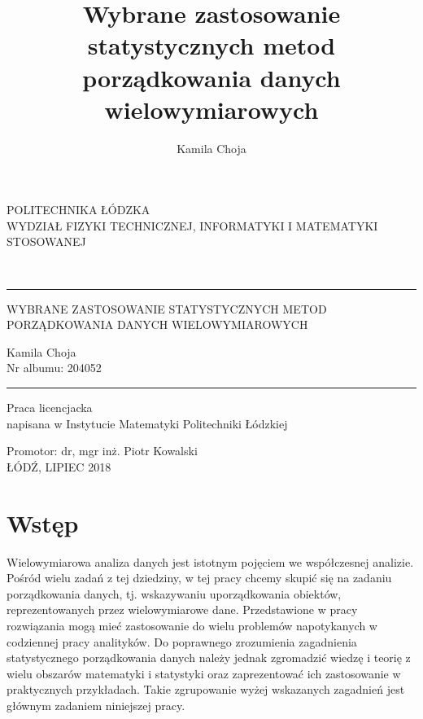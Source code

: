 \documentclass[12pt,a4paper]{report}
\author{Kamila Choja}
\title{Wybrane zastosowanie statystycznych metod porządkowania danych wielowymiarowych}
\begin{document}
\begin{titlepage}
\begin{center}
        \vspace*{1cm}
        {\large POLITECHNIKA ŁÓDZKA}\\
       \vspace*{1cm}
        {\large WYDZIAŁ FIZYKI TECHNICZNEJ, INFORMATYKI I MATEMATYKI STOSOWANEJ}\\
        \vspace*{2cm}
    \end{center}        
        
\\
\vspace*{0.3cm}
\hspace*{0.3cm}
  
\begin{center}
\rule{\textwidth}{0.5pt}

\vspace*{0.5cm}
   
{\large WYBRANE ZASTOSOWANIE STATYSTYCZNYCH METOD\\ }
{\large PORZĄDKOWANIA DANYCH WIELOWYMIAROWYCH\\}
\vspace*{1cm}


\begin{flushright}
Kamila Choja\\
Nr albumu: 204052 
 \end{flushright}
\rule{\textwidth}{0.5pt}

Praca licencjacka\\
napisana w Instytucie Matematyki Politechniki Łódzkiej\\

\vspace*{2cm}

Promotor: dr, mgr inż. Piotr Kowalski\\
\vfill
ŁÓDŹ, LIPIEC 2018


     \end{center}   
\end{titlepage}

\tableofcontents

\chapter{Wstęp}
Wielowymiarowa analiza danych jest istotnym pojęciem we współczesnej analizie. Pośród wielu zadań z tej dziedziny, w tej pracy chcemy skupić się na zadaniu porządkowania danych, tj. wskazywaniu uporządkowania obiektów, reprezentowanych przez wielowymiarowe dane. Przedstawione w pracy rozwiązania mogą mieć zastosowanie do wielu problemów napotykanych w codziennej pracy analityków. Do poprawnego zrozumienia zagadnienia statystycznego porządkowania danych należy jednak zgromadzić wiedzę i teorię z wielu obszarów matematyki i statystyki oraz zaprezentować ich zastosowanie w praktycznych przykładach. Takie zgrupowanie wyżej wskazanych zagadnień jest głównym zadaniem niniejszej pracy. 
\end{document}
